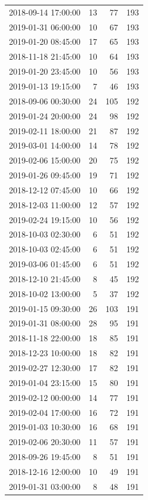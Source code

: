 \begin{tabular}{lrrr}
2018-09-14 17:00:00 & 13 & 77 & 193 \\
2019-01-31 06:00:00 & 10 & 67 & 193 \\
2019-01-20 08:45:00 & 17 & 65 & 193 \\
2018-11-18 21:45:00 & 10 & 64 & 193 \\
2019-01-20 23:45:00 & 10 & 56 & 193 \\
2019-01-13 19:15:00 & 7 & 46 & 193 \\
2018-09-06 00:30:00 & 24 & 105 & 192 \\
2019-01-24 20:00:00 & 24 & 98 & 192 \\
2019-02-11 18:00:00 & 21 & 87 & 192 \\
2019-03-01 14:00:00 & 14 & 78 & 192 \\
2019-02-06 15:00:00 & 20 & 75 & 192 \\
2019-01-26 09:45:00 & 19 & 71 & 192 \\
2018-12-12 07:45:00 & 10 & 66 & 192 \\
2018-12-03 11:00:00 & 12 & 57 & 192 \\
2019-02-24 19:15:00 & 10 & 56 & 192 \\
2018-10-03 02:30:00 & 6 & 51 & 192 \\
2018-10-03 02:45:00 & 6 & 51 & 192 \\
2019-03-06 01:45:00 & 6 & 51 & 192 \\
2018-12-10 21:45:00 & 8 & 45 & 192 \\
2018-10-02 13:00:00 & 5 & 37 & 192 \\
2019-01-15 09:30:00 & 26 & 103 & 191 \\
2019-01-31 08:00:00 & 28 & 95 & 191 \\
2018-11-18 22:00:00 & 18 & 85 & 191 \\
2018-12-23 10:00:00 & 18 & 82 & 191 \\
2019-02-27 12:30:00 & 17 & 82 & 191 \\
2019-01-04 23:15:00 & 15 & 80 & 191 \\
2019-02-12 00:00:00 & 14 & 77 & 191 \\
2019-02-04 17:00:00 & 16 & 72 & 191 \\
2019-01-03 10:30:00 & 16 & 68 & 191 \\
2019-02-06 20:30:00 & 11 & 57 & 191 \\
2018-09-26 19:45:00 & 8 & 51 & 191 \\
2018-12-16 12:00:00 & 10 & 49 & 191 \\
2019-01-31 03:00:00 & 8 & 48 & 191 \\

\end{tabular}
